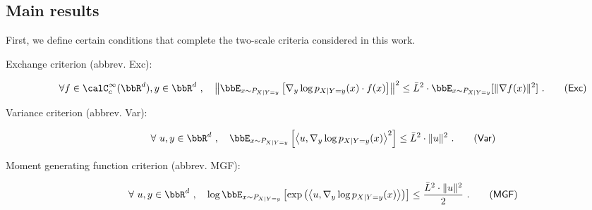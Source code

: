 \documentclass[11pt]{article}
\newcounter{ct}
\newcommand{\cssf}[1]{\calC_{c}^{\infty}(#1)}
\begin{document}
\subsection{Main results}

First, we define certain conditions that complete the two-scale criteria considered in this work.

\begin{description}
    \item [Exchange criterion (abbrev. \textsf{Exc}): ]
    \begin{equation*}
        \forall f \in \cssf{\bbR^{d}}, y \in \bbR^{d}~, \quad \left\|\bbE_{x \sim P_{X | Y = y}}\left[\nabla_{y} \log p_{X | Y = y}(x) \cdot f(x)\right]\right\|^{2} \leq \bar{L}^{2} \cdot \bbE_{x \sim P_{X | Y = y}}[\|\nabla f(x)\|^{2}]~.\tag{\textsf{Exc}}\label{eq:2scale-exc}
    \end{equation*}

    \item [Variance criterion (abbrev. \textsf{Var}): ]
    \begin{equation*}
        \forall~u, y \in \bbR^{d}~, \quad\bbE_{x \sim P_{X | Y = y}}\left[\left\langle u, \nabla_{y}\log p_{X | Y = y}(x)\right\rangle^{2}\right] \leq \bar{L}^{2} \cdot \|u\|^{2}~.\tag{\textsf{Var}}\label{eq:2scale-bvar}
    \end{equation*}
    \item [Moment generating function criterion (abbrev. \textsf{MGF}): ]
    \begin{equation*}
        \forall~u, y \in \bbR^{d}~, \quad \log \bbE_{x \sim P_{X | Y = y}}\left[\exp\left(\left\langle u, \nabla_{y}\log p_{X | Y = y}(x)\right\rangle \right)\right] \leq \frac{\bar{L}^{2} \cdot \|u\|^{2}}{2}~.\tag{\textsf{MGF}}\label{eq:2scale-bmgf}
    \end{equation*}
\end{description}
\end{document}
